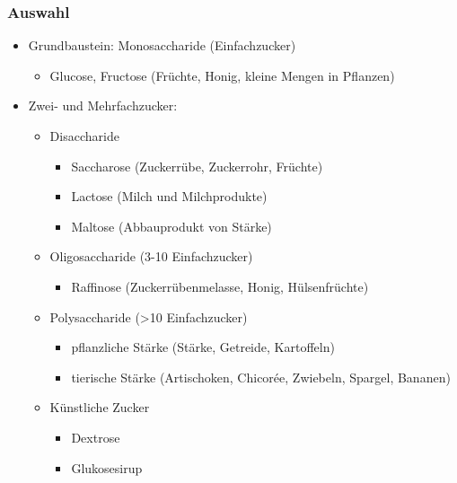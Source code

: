\documentclass[ngerman, aspectratio=169]{beamer}
\begin{document}
\begin{frame}
  \frametitle{Auswahl}
  \begin{multicols}{2}
  \begin{itemize}
  \item<+-> Grundbaustein: Monosaccharide (Einfachzucker)
    \begin{itemize}
    \item Glucose, Fructose (Früchte, Honig, kleine Mengen in Pflanzen)
    \end{itemize}
  \item<+-> Zwei- und Mehrfachzucker:
    \begin{itemize}
    \item<+-> Disaccharide
      \begin{itemize}
      \item Saccharose (Zuckerrübe, Zuckerrohr, Früchte)
      \item Lactose (Milch und Milchprodukte)
      \item Maltose (Abbauprodukt von Stärke)
      \end{itemize}
      
      \vfill\null
      \columnbreak
    \item<+-> Oligosaccharide (3-10 Einfachzucker)
      \begin{itemize}
      \item Raffinose (Zuckerrübenmelasse, Honig, Hülsenfrüchte)
      \end{itemize}
    \item<+-> Polysaccharide (>10 Einfachzucker)
      \begin{itemize}
      \item pflanzliche Stärke (Stärke, Getreide, Kartoffeln)
      \item tierische Stärke (Artischoken, Chicorée, Zwiebeln, Spargel, Bananen)
      \end{itemize}
    \item<+-> Künstliche Zucker
      \begin{itemize}
      \item Dextrose
      \item Glukosesirup
      \end{itemize}

    \end{itemize}

  \end{itemize}
\end{multicols}
\end{frame}
\end{document}

